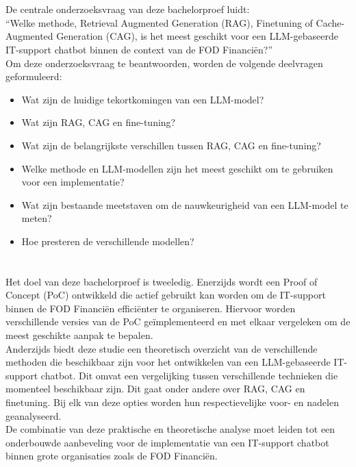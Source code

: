 \section{}%
\label{sec:onderzoeksvraag}

De centrale onderzoeksvraag van deze bachelorproef luidt:
\\[1em]
“{Welke methode, Retrieval Augmented Generation (RAG), Finetuning of Cache-Augmented Generation (CAG), is het meest geschikt voor een LLM-gebaseerde IT-support chatbot binnen de context van de FOD Financiën?}”
\\[1em]
Om deze onderzoeksvraag te beantwoorden, worden de volgende deelvragen geformuleerd:

\begin{itemize}
    \item Wat zijn de huidige tekortkomingen van een LLM-model?
    \item Wat zijn  RAG, CAG en fine-tuning?
    \item Wat zijn de belangrijkste verschillen tussen RAG, CAG en fine-tuning?
    \item Welke methode en LLM-modellen zijn het meest geschikt om te gebruiken voor een implementatie?
    \item Wat zijn bestaande meetstaven om de nauwkeurigheid van een LLM-model te meten?
    \item Hoe presteren de verschillende modellen?
\end{itemize}

\section{}%
\label{sec:onderzoeksdoelstelling}

Het doel van deze bachelorproef is tweeledig. Enerzijds wordt een Proof of Concept (PoC) ontwikkeld die actief gebruikt kan worden om de IT-support binnen de FOD Financiën efficiënter te organiseren. Hiervoor worden verschillende versies van de PoC geïmplementeerd en met elkaar vergeleken om de meest geschikte aanpak te bepalen.
\\[1em]
Anderzijds biedt deze studie een theoretisch overzicht van de verschillende methoden die beschikbaar zijn voor het ontwikkelen van een LLM-gebaseerde IT-support chatbot. Dit omvat een vergelijking tussen verschillende technieken die momenteel beschikbaar zijn. Dit gaat onder andere over RAG, CAG en finetuning. Bij elk van deze opties worden hun respectievelijke voor- en nadelen geanalyseerd.
\\[1em]
De combinatie van deze praktische en theoretische analyse moet leiden tot een onderbouwde aanbeveling voor de implementatie van een IT-support chatbot binnen grote organisaties zoals de FOD Financiën.

